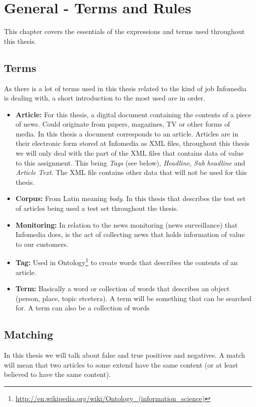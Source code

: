 \chapter{General - Terms and Rules}

This chapter covers the essentials of the expressions and terms used throughout this thesis.

\section{Terms}

As there is a lot of terms used in this thesis related to the kind of job Infomedia is dealing with, a short introduction to the most used are in order.
\begin{itemize}
\item \textbf{Article:} For this thesis, a digital document containing the contents of a piece of news. Could originate from papers, magazines, TV or other forms of media. In this thesis a document corresponds to an article. Articles are in their electronic form stored at Infomedia as XML files, throughout this thesis we will only deal with the part of the XML files that contains data of value to this assignment. This being \textit{Tags} (see below), \textit{Headline}, \textit{Sub headline} and \textit{Article Text}. The XML file contains other data that will not be used for this thesis.
\item \textbf{Corpus:} From Latin meaning \textit{body}. In this thesis that describes the test set of articles being used a test set throughout the thesis.
\item \textbf{Monitoring:} In relation to the news monitoring (news surveillance) that Infomedia does, is the act of collecting news that holds information of value to our customers.
\item \textbf{Tag:} Used in Ontology\footnote{\url{http://en.wikipedia.org/wiki/Ontology_(information_science)}} to create words that describes the contents of an article.
\item \textbf{Term:} Basically a word or collection of words that describes an object (person, place, topic etcetera). A term will be something that can be searched for. A term can also be a collection of words
\end{itemize}

\section{Matching}
In this thesis we will talk about false and true positives and negatives. A match will mean that two articles to some extend have the same content (or at least believed to have the same content).

